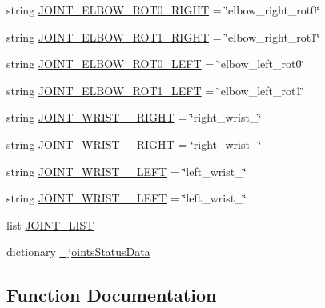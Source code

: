 \begin{DoxyCompactItemize}
\item 
string \mbox{\hyperlink{namespacemultiple__steering__trajectories_a2421e3dc524fabed929484b33cad297e}{J\+O\+I\+N\+T\+\_\+\+E\+L\+B\+O\+W\+\_\+\+R\+O\+T0\+\_\+\+R\+I\+G\+HT}} = \char`\"{}elbow\+\_\+right\+\_\+rot0\char`\"{}
\item 
string \mbox{\hyperlink{namespacemultiple__steering__trajectories_a7320ffb4a1a15902a7dc88231ef9a0d1}{J\+O\+I\+N\+T\+\_\+\+E\+L\+B\+O\+W\+\_\+\+R\+O\+T1\+\_\+\+R\+I\+G\+HT}} = \char`\"{}elbow\+\_\+right\+\_\+rot1\char`\"{}
\item 
string \mbox{\hyperlink{namespacemultiple__steering__trajectories_a067f01844f0fc5b1883a70006f8b0eeb}{J\+O\+I\+N\+T\+\_\+\+E\+L\+B\+O\+W\+\_\+\+R\+O\+T0\+\_\+\+L\+E\+FT}} = \char`\"{}elbow\+\_\+left\+\_\+rot0\char`\"{}
\item 
string \mbox{\hyperlink{namespacemultiple__steering__trajectories_a8f4004b57cf508ee232f1cf9cc21bd1c}{J\+O\+I\+N\+T\+\_\+\+E\+L\+B\+O\+W\+\_\+\+R\+O\+T1\+\_\+\+L\+E\+FT}} = \char`\"{}elbow\+\_\+left\+\_\+rot1\char`\"{}
\item 
string \mbox{\hyperlink{namespacemultiple__steering__trajectories_a88f494724ae43ed8da78b33f6cb555d3}{J\+O\+I\+N\+T\+\_\+\+W\+R\+I\+S\+T\+\_\+\_\+\+R\+I\+G\+HT}} = \char`\"{}right\+\_\+wrist\+\_\char`\"{}
\item 
string \mbox{\hyperlink{namespacemultiple__steering__trajectories_a847e6506769b6ef65661b15b1871ec53}{J\+O\+I\+N\+T\+\_\+\+W\+R\+I\+S\+T\+\_\+\_\+\+R\+I\+G\+HT}} = \char`\"{}right\+\_\+wrist\+\_\char`\"{}
\item 
string \mbox{\hyperlink{namespacemultiple__steering__trajectories_af0eeca9a5da6fc28828efd10a57d4701}{J\+O\+I\+N\+T\+\_\+\+W\+R\+I\+S\+T\+\_\+\_\+\+L\+E\+FT}} = \char`\"{}left\+\_\+wrist\+\_\char`\"{}
\item 
string \mbox{\hyperlink{namespacemultiple__steering__trajectories_a74dd05e4a5d772f6f6fbf29d09ed3dae}{J\+O\+I\+N\+T\+\_\+\+W\+R\+I\+S\+T\+\_\+\_\+\+L\+E\+FT}} = \char`\"{}left\+\_\+wrist\+\_\char`\"{}
\item 
list \mbox{\hyperlink{namespacemultiple__steering__trajectories_ad3a337f6f1a33141011fe06d8c6c7183}{J\+O\+I\+N\+T\+\_\+\+L\+I\+ST}}
\item 
dictionary \mbox{\hyperlink{namespacemultiple__steering__trajectories_a686667b766e6350bec95733b21f39960}{\+\_\+joints\+Status\+Data}}
\end{DoxyCompactItemize}


\subsection{Function Documentation}
\mbox{\label{namespacemultiple__steering__trajectories_ac0bd17bffe2692eebdd71240e34898d8}} 
